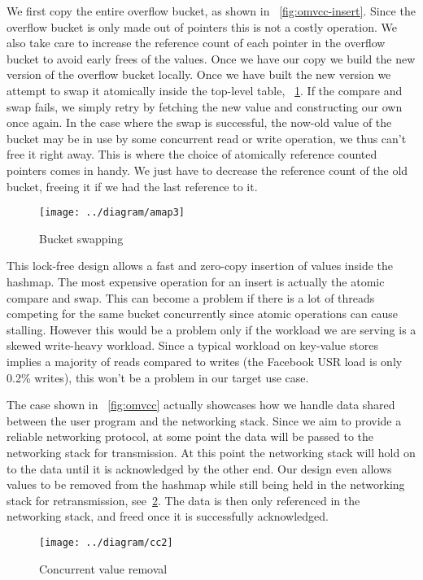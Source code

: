 \documentclass[11pt]{article}
\begin{document}
We first copy the entire overflow bucket, as shown in
~\ref{fig:omvcc-insert}. Since the overflow bucket is only made out of
pointers this is not a costly operation. We also take care to increase
the reference count of each pointer in the overflow bucket to avoid
early frees of the values. Once we have our copy we build the new
version of the overflow bucket locally. Once we have built the new
version we attempt to swap it atomically inside the top-level
table, ~\ref{fig:omvcc-swap}. If the compare and swap fails, we simply
retry by fetching the new value and constructing our own once
again. In the case where the swap is successful, the now-old value of
the bucket may be in use by some concurrent read or write operation,
we thus can't free it right away. This is where the choice of
atomically reference counted pointers comes in handy. We just have to
decrease the reference count of the old bucket, freeing it if we had
the last reference to it.

\begin{figure}
  \texttt{[image: ../diagram/amap3]}
  \caption{Bucket swapping}
  \label{fig:omvcc-swap}
\end{figure}

This lock-free design allows a fast and zero-copy insertion of values
inside the hashmap. The most expensive operation for an insert is
actually the atomic compare and swap. This can become a problem if
there is a lot of threads competing for the same bucket concurrently
since atomic operations can cause stalling. However this would be a
problem only if the workload we are serving is a skewed write-heavy
workload. Since a typical workload on key-value stores implies a
majority of reads compared to writes (the Facebook USR load is only
0.2\% writes), this won't be a problem in our target use case.

The case shown in ~\ref{fig:omvcc} actually showcases how we handle
data shared between the user program and the networking stack. Since
we aim to provide a reliable networking protocol, at some point the
data will be passed to the networking stack for transmission. At this
point the networking stack will hold on to the data until it is
acknowledged by the other end. Our design even allows values to be
removed from the hashmap while still being held in the networking
stack for retransmission, see~\ref{fig:cc2}. The data is then only
referenced in the networking stack, and freed once it is successfully
acknowledged.

\begin{figure}[h!]
  \texttt{[image: ../diagram/cc2]}
  \caption{Concurrent value removal}
  \label{fig:cc2}
\end{figure}
\end{document}
